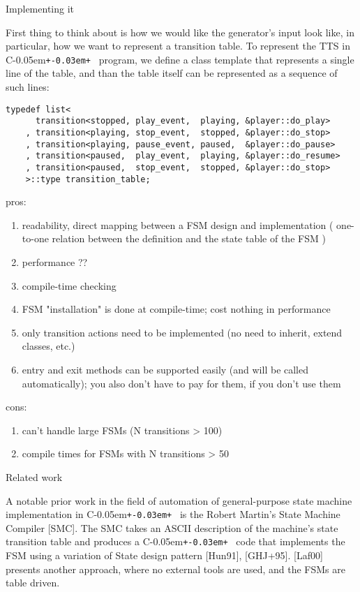 \documentclass{netobjectdays}
\newcommand{\Cpp}{C\kern-0.05em\texttt{+\kern-0.03em+}%
}
\begin{document}
Implementing it

First thing to think about is how we would like the generator's 
input look like, in particular, how we want to represent a 
transition table. To represent the TTS in \Cpp\ program, we define 
a  class template that represents a single line 
of the table, and than the table itself can be represented as a 
sequence of such lines:

{\footnotesize
\begin{verbatim}
typedef list<
      transition<stopped, play_event,  playing, &player::do_play>
    , transition<playing, stop_event,  stopped, &player::do_stop>
    , transition<playing, pause_event, paused,  &player::do_pause>
    , transition<paused,  play_event,  playing, &player::do_resume>
    , transition<paused,  stop_event,  stopped, &player::do_stop>
    >::type transition_table;
\end{verbatim}
}

pros:
\begin{enumerate}
\item readability, direct mapping between a FSM design and 
    implementation ( one-to-one relation between the 
    definition and the state table of the FSM )
\item performance ??
\item compile-time checking 
\item FSM "installation" is done at compile-time; cost 
    nothing in performance 
\item only transition actions need to be implemented 
    (no need to inherit, extend classes, etc.) 
\item entry and exit methods can be supported easily 
    (and will be called automatically); you also don't have 
    to pay for them, if you don't use them 
\end{enumerate}

cons:
\begin{enumerate}
\item can't handle large FSMs (N transitions > 100) 
\item compile times for FSMs with N transitions > 50 
\end{enumerate}


Related work

A notable prior work in the field of automation of general-purpose 
state machine implementation in \Cpp\ is the Robert Martin's State 
Machine Compiler [SMC]. The SMC takes an ASCII description of the 
machine's state transition table and produces a \Cpp\ code that 
implements the FSM using a variation of State design pattern [Hun91],
[GHJ+95]. [Laf00] presents another approach, where no external tools 
are used, and the FSMs are table driven. 
\end{document}
